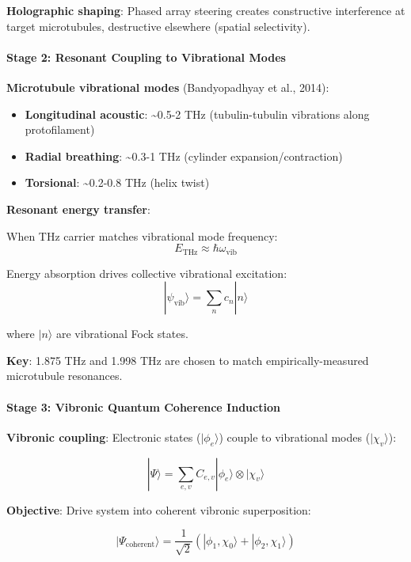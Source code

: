 \textbf{Holographic shaping}: Phased array steering creates constructive
interference at target microtubules, destructive elsewhere (spatial
selectivity).

\paragraph{Stage 2: Resonant Coupling to Vibrational
Modes}\label{stage-2-resonant-coupling-to-vibrational-modes}

\textbf{Microtubule vibrational modes} (Bandyopadhyay et al., 2014):

\begin{itemize}
\tightlist
\item
  \textbf{Longitudinal acoustic}: \textasciitilde0.5-2 THz
  (tubulin-tubulin vibrations along protofilament)
\item
  \textbf{Radial breathing}: \textasciitilde0.3-1 THz (cylinder
  expansion/contraction)
\item
  \textbf{Torsional}: \textasciitilde0.2-0.8 THz (helix twist)
\end{itemize}

\textbf{Resonant energy transfer}:

When THz carrier matches vibrational mode frequency:
\[E_{\text{THz}} \approx \hbar \omega_{\text{vib}}\]

Energy absorption drives collective vibrational excitation:
\[|\psi_{\text{vib}}\rangle = \sum_{n} c_n |n\rangle\]

where \(|n\rangle\) are vibrational Fock states.

\textbf{Key}: 1.875 THz and 1.998 THz are chosen to match
empirically-measured microtubule resonances.

\paragraph{Stage 3: Vibronic Quantum Coherence
Induction}\label{stage-3-vibronic-quantum-coherence-induction}

\textbf{Vibronic coupling}: Electronic states (\(|\phi_e\rangle\))
couple to vibrational modes (\(|\chi_v\rangle\)):

\[|\Psi\rangle = \sum_{e,v} C_{e,v} |\phi_e\rangle \otimes |\chi_v\rangle\]

\textbf{Objective}: Drive system into coherent vibronic superposition:

\[|\Psi_{\text{coherent}}\rangle = \frac{1}{\sqrt{2}}\left(|\phi_1, \chi_0\rangle + |\phi_2, \chi_1\rangle\right)\]

